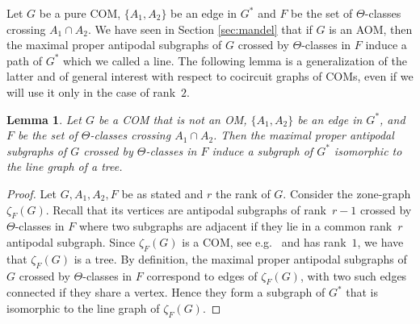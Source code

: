 \documentclass[final,11pt]{article}
\newtheorem{lem}[thm]{Lemma}%
\begin{document}
Let $G$ be a pure COM, $\{A_1, A_2\}$ be an edge in $G^*$ and $F$ be the set of $\Theta$-classes crossing $A_1\cap A_2$. We have seen in Section \ref{sec:mandel} that if $G$ is an AOM, then the maximal proper antipodal subgraphs of $G$ crossed by $\Theta$-classes in $F$ induce a path of $G^*$ which we called a line.
The following lemma is a generalization of the latter and of general interest with respect to cocircuit graphs of COMs, even if we will use it only in the case of rank~$2$.
\begin{lem}\label{lem:linetree}
Let $G$ be a COM that is not an OM, $\{A_1, A_2\}$ be an edge in $G^*$, and $F$ be the set of $\Theta$-classes crossing $A_1\cap A_2$. Then the maximal proper antipodal subgraphs of $G$ crossed by $\Theta$-classes in $F$ induce a subgraph of $G^*$ isomorphic to the line graph of a tree.
\end{lem}
\begin{proof}
Let $G, A_1, A_2, F$ be as stated and $r$ the rank of $G$. Consider the zone-graph $\zeta_F(G)$. Recall that its vertices are antipodal subgraphs of rank~$r-1$ crossed by $\Theta$-classes in $F$ where two subgraphs are adjacent if they lie in a common rank~$r$ antipodal subgraph. Since $\zeta_F(G)$ is a COM, see e.g.~\cite{Kna-17} and has rank~$1$, we have that $\zeta_F(G)$ is a tree. By definition, the maximal proper antipodal subgraphs of $G$ crossed by $\Theta$-classes in $F$ correspond to edges of $\zeta_F(G)$, with two such edges connected if they share a vertex. Hence they form a subgraph of $G^*$ that is isomorphic to the line graph of $\zeta_F(G)$.
\end{proof}

\end{document}

